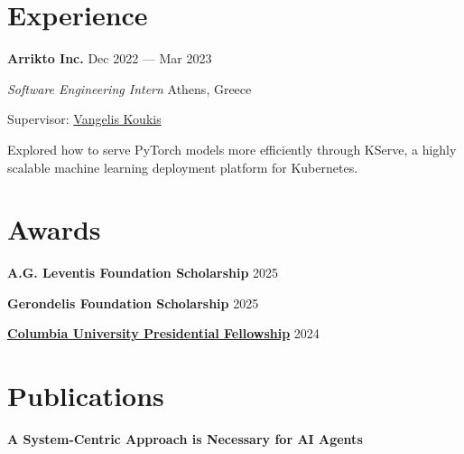\documentclass[margin,12pt]{resume}
\newcommand{\descriptionVSpace}{\vspace{0.5ex}\xspace}
\newcommand{\subsectionVSpace}{\vspace{3.5ex}\xspace}
\newcommand{\sectionVSpace}{\vspace{1ex}\xspace} %
\newcommand{\sectionVSpaceCorrection}{\vspace{-3.5ex}} %
\newcommand{\header}[1]{\textbf{#1}\xspace}
\newcommand{\company}[1]{\header{#1}\xspace}
\newcommand{\fellowship}[1]{\header{#1}\xspace}
\newcommand{\interval}[2]{#1 --- #2\xspace}
\newcommand{\paperTitle}[1]{\header{#1}\xspace}
\newcommand{\place}[1]{#1\xspace}
\newcommand{\role}[1]{\textit{#1}\xspace}
\newcommand{\stitle}[1]{#1:\xspace}
\newenvironment{rSubsection}{}{\par\subsectionVSpace}
\newenvironment{rSection}[1]{\sectionVSpaceCorrection\section{#1}\xspace}{\sectionVSpace\par}
\newenvironment{jobDuties}{\descriptionVSpace}{\par}
\begin{document}
\begin{resume}
\begin{rSection}{Experience}



        \begin{rSubsection}
            \company{Arrikto Inc.} \hfill \interval{Dec 2022}{Mar 2023}

            \role{Software Engineering Intern} \hfill \place{Athens, Greece}

            \stitle{Supervisor} \href{https://www.linkedin.com/in/vkoukis/}{Vangelis Koukis}

            \begin{jobDuties}
                Explored how to serve PyTorch models more efficiently through KServe, a highly scalable machine learning deployment platform for Kubernetes.
            \end{jobDuties}
        \end{rSubsection}
    \end{rSection}


    \begin{rSection}{Awards}
        \begin{rSubsection}
            \fellowship{A.G. Leventis Foundation Scholarship} \hfill 2025
        \end{rSubsection}

        \begin{rSubsection}
            \fellowship{Gerondelis Foundation Scholarship} \hfill 2025
        \end{rSubsection}

        \begin{rSubsection}
            \fellowship{\href{https://www.cs.columbia.edu/2024/meet-the-scholars-phd-students-with-prestigious-fellowships/}{Columbia University Presidential Fellowship}} \hfill 2024
        \end{rSubsection}
    \end{rSection}

    \begin{rSection}{Publications}
        \begin{rSubsection}
            \paperTitle{A System-Centric Approach is Necessary for AI Agents}


\end{rSubsection}
\end{rSection}
\end{resume}
\end{document}
